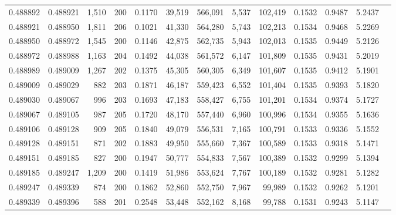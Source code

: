\begin{tabular}{rrrrrrrrrrrrr}
0.488892 & 0.488921 & 1,510 & 200 &                                     0.1170 &  39,519 & 566,091 &   5,537 & 102,419 & 0.1532 & 0.9487 & 5.2437 \\
0.488921 & 0.488950 & 1,811 & 206 &                                     0.1021 &  41,330 & 564,280 &   5,743 & 102,213 & 0.1534 & 0.9468 & 5.2269 \\
0.488950 & 0.488972 & 1,545 & 200 &                                     0.1146 &  42,875 & 562,735 &   5,943 & 102,013 & 0.1535 & 0.9449 & 5.2126 \\
0.488972 & 0.488988 & 1,163 & 204 &                                     0.1492 &  44,038 & 561,572 &   6,147 & 101,809 & 0.1535 & 0.9431 & 5.2019 \\
0.488989 & 0.489009 & 1,267 & 202 &                                     0.1375 &  45,305 & 560,305 &   6,349 & 101,607 & 0.1535 & 0.9412 & 5.1901 \\
0.489009 & 0.489029 &   882 & 203 &                                     0.1871 &  46,187 & 559,423 &   6,552 & 101,404 & 0.1535 & 0.9393 & 5.1820 \\
0.489030 & 0.489067 &   996 & 203 &                                     0.1693 &  47,183 & 558,427 &   6,755 & 101,201 & 0.1534 & 0.9374 & 5.1727 \\
0.489067 & 0.489105 &   987 & 205 &                                     0.1720 &  48,170 & 557,440 &   6,960 & 100,996 & 0.1534 & 0.9355 & 5.1636 \\
0.489106 & 0.489128 &   909 & 205 &                                     0.1840 &  49,079 & 556,531 &   7,165 & 100,791 & 0.1533 & 0.9336 & 5.1552 \\
0.489128 & 0.489151 &   871 & 202 &                                     0.1883 &  49,950 & 555,660 &   7,367 & 100,589 & 0.1533 & 0.9318 & 5.1471 \\
0.489151 & 0.489185 &   827 & 200 &                                     0.1947 &  50,777 & 554,833 &   7,567 & 100,389 & 0.1532 & 0.9299 & 5.1394 \\
0.489185 & 0.489247 & 1,209 & 200 &                                     0.1419 &  51,986 & 553,624 &   7,767 & 100,189 & 0.1532 & 0.9281 & 5.1282 \\
0.489247 & 0.489339 &   874 & 200 &                                     0.1862 &  52,860 & 552,750 &   7,967 &  99,989 & 0.1532 & 0.9262 & 5.1201 \\
0.489339 & 0.489396 &   588 & 201 &                                     0.2548 &  53,448 & 552,162 &   8,168 &  99,788 & 0.1531 & 0.9243 & 5.1147 \\

\end{tabular}
